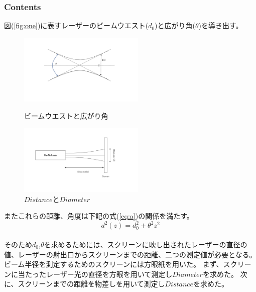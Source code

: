 \documentclass[11pt, a4paper]{jsarticle}
\begin{document}
\subsubsection{Contents}
図(\ref{fig:one})に表すレーザーのビームウエスト($d_0$)と広がり角($\theta$)を導き出す。
\begin{figure}[htbp]
 \begin{minipage}{0.45\hsize}
  \begin{center}
   \includegraphics[width=60mm]{fig1.png}
  \end{center}
  \caption{ビームウエストと広がり角}
  \label{fig:one}
 \end{minipage}
 \begin{minipage}{0.45\hsize}
  \begin{center}
   \includegraphics[width=60mm]{fig2.png}
  \end{center}
  \caption{$Distance$と$Diameter$}
  \label{fig:two}
 \end{minipage}
\end{figure}
\newpage
またこれらの距離、角度は下記の式(\ref{eq:a})の関係を満たす。
\begin{equation}
    d^2(z) = d_0^2 + \theta^2z^2 \label{eq:a}
\end{equation}\\
そのため$d_0$,$\theta$を求めるためには、スクリーンに映し出されたレーザーの直径の値、レーザーの射出口からスクリーンまでの距離、二つの測定値が必要となる。
ビーム半径を測定するためのスクリーンには方眼紙を用いた。
まず、スクリーンに当たったレーザー光の直径を方眼を用いて測定し$Diameter$を求めた。
次に、スクリーンまでの距離を物差しを用いて測定し$Distance$を求めた。
\end{document}
